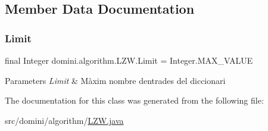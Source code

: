 \subsection{Member Data Documentation}
\mbox{\label{classdomini_1_1algorithm_1_1LZW_a6d83dbcda4939db767fa0522d40fcc0a}} 
\subsubsection{\texorpdfstring{Limit}{Limit}}
{\footnotesize\ttfamily final Integer domini.\+algorithm.\+L\+Z\+W.\+Limit = Integer.\+M\+A\+X\+\_\+\+V\+A\+L\+UE\hspace{0.3cm}{\ttfamily [package]}}


\begin{DoxyParams}{Parameters}
{\em Limit} & Màxim nombre d\textquotesingle{}entrades del diccionari \\
\hline
\end{DoxyParams}


The documentation for this class was generated from the following file\+:\begin{DoxyCompactItemize}
\item 
src/domini/algorithm/\hyperlink{LZW_8java}{L\+Z\+W.\+java}\end{DoxyCompactItemize}
